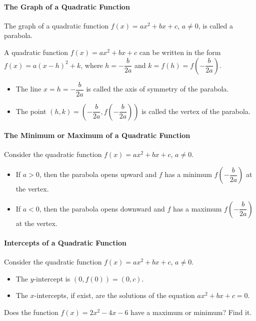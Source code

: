 

\paragraph*{The Graph of a Quadratic Function}
	The graph of a quadratic function $f(x)=ax^2+bx+c$, $a\neq 0$, is called a parabola.

	A quadratic function $f(x)=ax^2+bx+c$ can be written in the form $f(x)=a(x-h)^2+k$, where $h=-\dfrac{b}{2a}$ and $k=f(h)=f\left(-\dfrac{b}{2a}\right)$.
	\begin{itemize}
		\item  The line $x=h=-\dfrac{b}{2a}$ is called the axis of symmetry of the parabola.
		\item The point $(h, k)=\left(-\dfrac{b}{2a}, f\left(-\dfrac{b}{2a}\right)\right)$ is called the vertex of the parabola.
	\end{itemize}

\paragraph*{The Minimum or Maximum of a Quadratic Function}
	Consider the quadratic function $f(x)=ax^2+bx+c$, $a\neq 0$.

	\begin{itemize}
		\item If $a>0$, then the parabola opens upward and $f$ has a minimum  $f\left(-\dfrac{b}{2a}\right)$ at the vertex.
		\item If $a<0$, then the parabola opens downward and $f$ has a maximum  $f\left(-\dfrac{b}{2a}\right)$ at the vertex.
	\end{itemize}

\paragraph*{Intercepts of a Quadratic Function}
	Consider the quadratic function $f(x)=ax^2+bx+c$, $a\neq 0$.
	\begin{itemize}
		\item The $y$-intercept is $(0, f(0))=(0, c)$.
		\item  The $x$-intercepts, if exist, are the solutions of the equation $ax^2+bx+c=0$.
	\end{itemize}

	\begin{example}
		Does the function $f(x)=2x^2-4x-6$ have a maximum or minimum? Find it.
	\end{example}

